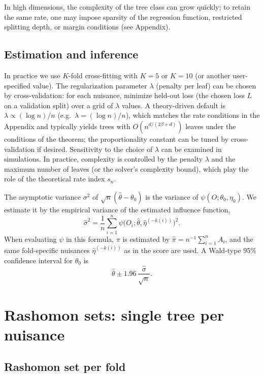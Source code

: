 \documentclass[12pt]{article}
\begin{document}
In high dimensions, the complexity of the tree class can grow quickly; to retain the same rate, one may impose sparsity of the regression function, restricted splitting depth, or margin conditions (see Appendix).

\subsection{Estimation and inference}

In practice we use $K$-fold cross-fitting with $K = 5$ or $K = 10$ (or another user-specified value). The regularization parameter $\lambda$ (penalty per leaf) can be chosen by cross-validation: for each nuisance, minimize held-out loss (the chosen loss $L$ on a validation split) over a grid of $\lambda$ values. A theory-driven default is $\lambda \propto (\log n)/n$ (e.g.\ $\lambda = (\log n)/n$), which matches the rate conditions in the Appendix and typically yields trees with $O(n^{d/(2\beta+d)})$ leaves under the conditions of the theorem; the proportionality constant can be tuned by cross-validation if desired. Sensitivity to the choice of $\lambda$ can be examined in simulations. In practice, complexity is controlled by the penalty $\lambda$ and the maximum number of leaves (or the solver's complexity bound), which play the role of the theoretical rate index $s_n$.

The asymptotic variance $\sigma^2$ of $\sqrt{n}(\hat\theta - \theta_0)$ is the variance of $\psi(O; \theta_0, \eta_0)$. We estimate it by the empirical variance of the estimated influence function,
\begin{equation}
\hat\sigma^2 = \frac{1}{n} \sum_{i=1}^n \psi\bigl(O_i; \hat\theta, \hat\eta^{(-k(i))}\bigr)^2.
\end{equation}
When evaluating $\psi$ in this formula, $\pi$ is estimated by $\hat{\pi} = n^{-1} \sum_{i=1}^n A_i$, and the same fold-specific nuisances $\hat{\eta}^{(-k(i))}$ as in the score are used. A Wald-type 95\% confidence interval for $\theta_0$ is
\begin{equation}
\hat\theta \pm 1.96 \, \frac{\hat\sigma}{\sqrt{n}}.
\end{equation}

\section{Rashomon sets: single tree per nuisance}
\label{sec:rashomon}

\subsection{Rashomon set per fold}
\end{document}
